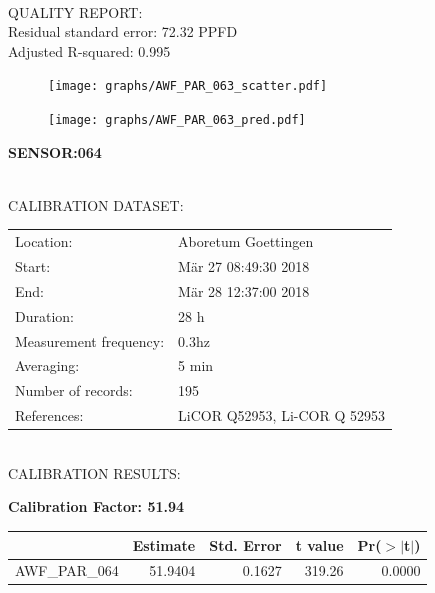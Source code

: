 \documentclass[oneside]{report}
\begin{document}
\hrulefill\\
QUALITY REPORT:\\
Residual standard error: 72.32 PPFD\\
Adjusted R-squared: 0.995



\begin{figure}[H]
  \centering
  \texttt{[image: graphs/AWF\_PAR\_063\_scatter.pdf]}
\end{figure}




\begin{figure}[H]
  \centering
  \texttt{[image: graphs/AWF\_PAR\_063\_pred.pdf]}
\end{figure}

\pagebreak


\begin{center}
\large{\textbf{SENSOR:064}}\\
\end{center}

\hrulefill\\
CALIBRATION DATASET:\\
\begin{table}[h!]
  \centering
  \label{tab:table1}
  \begin{tabular}{ll}
    Location: & Aboretum Goettingen\\ 
    
    
    Start:  & Mär 27 08:49:30 2018 \\
    End:   & Mär 28 12:37:00 2018\\ 
    Duration: & 28 h\\
    Measurement frequency: & 0.3hz\\
    Averaging:  &5 min\\
    Number of records: & 195 \\
    References: & LiCOR Q52953, Li-COR Q 52953 \\
  \end{tabular}
\end{table}

\hrulefill\\
CALIBRATION RESULTS:\\


\begin{center}
\textbf{\large{Calibration Factor: 51.94}}\\
\end{center}
\begin{table}[ht]
\centering
\begin{tabular}{rrrrr}
  \hline
 & Estimate & Std. Error & t value & Pr($>$$|$t$|$) \\ 
  \hline
AWF\_PAR\_064 & 51.9404 & 0.1627 & 319.26 & 0.0000 \\ 
   \hline
\end{tabular}
\end{table}
\end{document}
